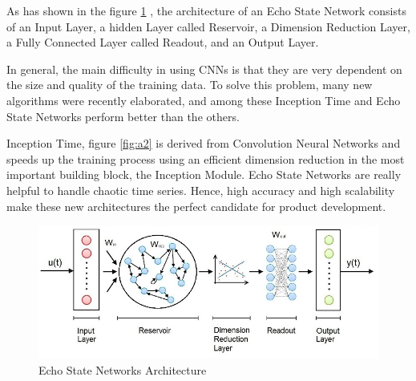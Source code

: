 As has shown in the figure \ref{fig:a3} , the architecture of an Echo State Network consists of an Input Layer, a hidden Layer called Reservoir, a Dimension Reduction Layer, a Fully Connected Layer called Readout, and an Output Layer.

In general, the main difficulty in using CNNs is that they are very dependent on the size and quality of the training data. To solve this problem, many new algorithms were recently elaborated, and among these Inception Time and Echo State Networks perform better than the others. 

Inception Time, figure \ref{fig:a2} is derived from Convolution Neural Networks and speeds up the training process using an efficient dimension reduction in the most important building block, the Inception Module. Echo State Networks are really helpful to handle chaotic time series. Hence, high accuracy and high scalability make these new architectures the perfect candidate for product development.
\begin{figure}[H]
    \centering
    \begin{minipage}[b]{\textwidth}
        \includegraphics[width=\textwidth]{manuscript/src/figures/project/app3.jpeg}
    \end{minipage}
    \caption{Echo State Networks Architecture \cite{Bianchi2018ReservoirSeries}}
    \label{fig:a3}
\end{figure}
